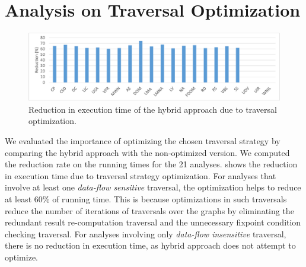
\section{Analysis on Traversal Optimization}
\label{sec:analysis-traversal-opt}

\begin{figure}
\centering
\includegraphics[width=\linewidth]{figures/hybrid-optimization}
\caption{Reduction in execution time of the hybrid approach due to traversal optimization.}%
\label{fig:hy-opt-off}%
\end{figure}

We evaluated the importance of optimizing the chosen traversal strategy by 
comparing the hybrid approach with the non-optimized version. We computed 
the reduction rate on the running times for the 21 analyses. 
 shows the reduction in execution time due to 
traversal strategy optimization. For analyses that involve at least one 
\textit{data-flow sensitive} traversal, the optimization helps to reduce at 
least 60\% of running time. This is because optimizations in such traversals 
reduce the number of iterations of traversals over the graphs by eliminating 
the redundant result re-computation traversal and the
unnecessary fixpoint condition checking traversal. For analyses involving only 
\textit{data-flow insensitive} traversal, there is no reduction in execution time, as 
hybrid approach does not attempt to optimize.


